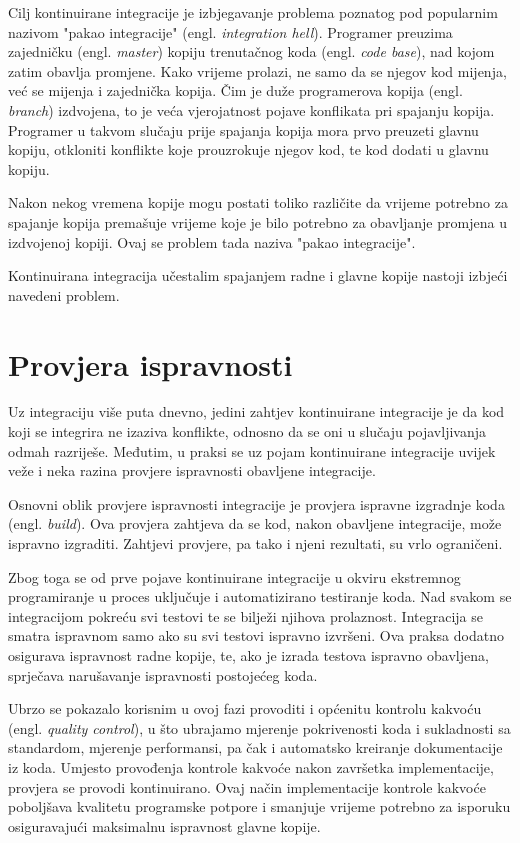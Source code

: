 \documentclass[times, utf8, seminar, numeric]{fer}
\newcommand{\eng}[1]{(engl. \textit{#1})}
\begin{document}
Cilj kontinuirane integracije je izbjegavanje problema poznatog pod popularnim nazivom "pakao integracije" \eng{integration hell}. Programer preuzima zajedničku \eng{master} kopiju trenutačnog koda \eng{code base}, nad kojom zatim obavlja promjene. Kako vrijeme prolazi, ne samo da se njegov kod mijenja, već se mijenja i zajednička kopija. Čim je duže programerova kopija \eng{branch} izdvojena, to je veća vjerojatnost pojave konflikata pri spajanju kopija. Programer u takvom slučaju prije spajanja kopija mora prvo preuzeti glavnu kopiju, otkloniti konflikte koje prouzrokuje njegov kod, te kod dodati u glavnu kopiju.

Nakon nekog vremena kopije mogu postati toliko različite da vrijeme potrebno za spajanje kopija premašuje vrijeme koje je bilo potrebno za obavljanje promjena u izdvojenoj kopiji. Ovaj se problem tada naziva "pakao integracije". 

Kontinuirana integracija učestalim spajanjem radne i glavne kopije nastoji izbjeći navedeni problem.

\section{Provjera ispravnosti}
Uz integraciju više puta dnevno, jedini zahtjev kontinuirane integracije je da kod koji se integrira ne izaziva konflikte, odnosno da se oni u slučaju pojavljivanja odmah razriješe. Međutim, u praksi se uz pojam kontinuirane integracije uvijek veže i neka razina provjere ispravnosti obavljene integracije.

Osnovni oblik provjere ispravnosti integracije je provjera ispravne izgradnje koda \eng{build}. Ova provjera zahtjeva da se kod, nakon obavljene integracije, može ispravno izgraditi. Zahtjevi provjere, pa tako i njeni rezultati, su vrlo ograničeni.

Zbog toga se od prve pojave kontinuirane integracije u okviru ekstremnog programiranje u proces uključuje i automatizirano testiranje koda. Nad svakom se integracijom pokreću svi testovi te se bilježi njihova prolaznost. Integracija se smatra ispravnom samo ako su svi testovi ispravno izvršeni. Ova praksa dodatno osigurava ispravnost radne kopije, te, ako je izrada testova ispravno obavljena, sprječava narušavanje ispravnosti postojećeg koda.

Ubrzo se pokazalo korisnim u ovoj fazi provoditi i općenitu kontrolu kakvoću \eng{quality control}, u što ubrajamo mjerenje pokrivenosti koda i sukladnosti sa standardom, mjerenje performansi, pa čak i automatsko kreiranje dokumentacije iz koda. Umjesto provođenja kontrole kakvoće nakon završetka implementacije, provjera se provodi kontinuirano. Ovaj način implementacije kontrole kakvoće poboljšava kvalitetu programske potpore i smanjuje vrijeme potrebno za isporuku osiguravajući maksimalnu ispravnost glavne kopije.
\end{document}

